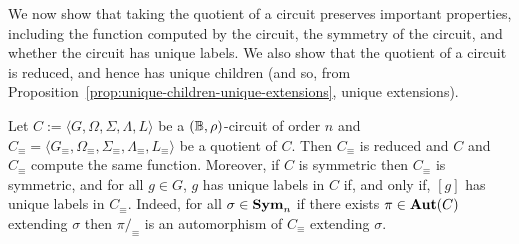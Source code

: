 \documentclass[../paper.tex]{subfiles}
\begin{document}
We now show that taking the quotient of a circuit preserves important
properties, including the function computed by the circuit, the symmetry of the
circuit, and whether the circuit has unique labels. We also show that the
quotient of a circuit is reduced, and hence has unique children (and so, from
Proposition~\ref{prop:unique-children-unique-extensions}, unique extensions).

\begin{lem}
  Let $C := \langle G, \Omega, \Sigma, \Lambda, L\rangle$ be a $(\mathbb{B},
  \rho)$-circuit of order $n$ and $C_{\equiv} = \langle G_\equiv ,
  \Omega_\equiv, \Sigma_\equiv , \Lambda_\equiv, L_\equiv \rangle$ be a quotient
  of $C$. Then $C_\equiv$ is reduced and $C$ and $C_{\equiv}$ compute the same
  function. Moreover, if $C$ is symmetric then $C_{\equiv}$ is symmetric, and
  for all $g \in G$, $g$ has unique labels in $C$ if, and only if, $[g]$ has
  unique labels in $C_{\equiv}$.  Indeed, for all $\sigma \in \text{\textbf{Sym}}_n$ if there
  exists $\pi \in \text{\textbf{Aut}}(C)$ extending $\sigma$ then $\pi /_\equiv$ is an
  automorphism of $C_\equiv$ extending $\sigma$.
  \label{lem:quotient-circuits-preserve}
\end{lem}
\end{document}
